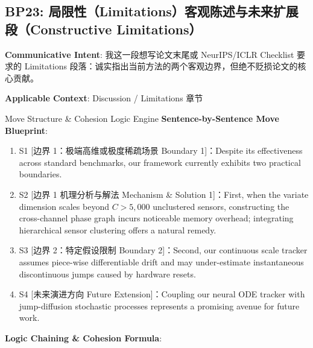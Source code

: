 \subsection{BP23: 局限性（Limitations）客观陈述与未来扩展段（Constructive Limitations）}\label{sec:bp:BP23}
\noindent\textbf{\color{AcadNavy}Communicative Intent}: 我这一段想写论文末尾或 NeurIPS/ICLR Checklist 要求的 Limitations 段落：诚实指出当前方法的两个客观边界，但绝不贬损论文的核心贡献。\par\vspace{2pt}
\noindent\textbf{\color{AcadSlate}Applicable Context}: Discussion / Limitations 章节\par\vspace{4pt}
\begin{ConceptBox}{Move Structure \& Cohesion Logic Engine}
\textbf{Sentence-by-Sentence Move Blueprint}:
\begin{enumerate}[label=\textbf{\color{AcadNavy}S\arabic*.}, leftmargin=2em, itemsep=2pt]
  \item S1 [边界 1：极端高维或极度稀疏场景 Boundary 1]：Despite its effectiveness across standard benchmarks, our framework currently exhibits two practical boundaries.
  \item S2 [边界 1 机理分析与解法 Mechanism \& Solution 1]：First, when the variate dimension scales beyond $C > 5,000$ unclustered sensors, constructing the cross-channel phase graph incurs noticeable memory overhead; integrating hierarchical sensor clustering offers a natural remedy.
  \item S3 [边界 2：特定假设限制 Boundary 2]：Second, our continuous scale tracker assumes piece-wise differentiable drift and may under-estimate instantaneous discontinuous jumps caused by hardware resets.
  \item S4 [未来演进方向 Future Extension]：Coupling our neural ODE tracker with jump-diffusion stochastic processes represents a promising avenue for future work.
\end{enumerate}\par\vspace{4pt}
\textbf{Logic Chaining \& Cohesion Formula}:\par{}
\end{ConceptBox}
